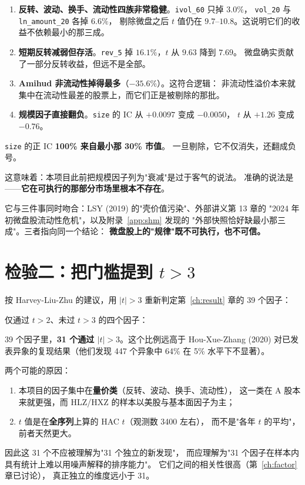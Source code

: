 \begin{enumerate}
  \item \textbf{反转、波动、换手、流动性四族非常稳健}。\texttt{ivol\_60} 只掉 $3.0\%$，
        \texttt{vol\_20} 与 \texttt{ln\_amount\_20} 各掉 $6.6\%$，
        剔除微盘之后 $t$ 值仍在 $9.7$--$10.8$。这说明它们的收益不依赖最小的那三成。
  \item \textbf{短期反转减弱但存活}。\texttt{rev\_5} 掉 $16.1\%$，$t$ 从 $9.63$ 降到 $7.69$。
        微盘确实贡献了一部分反转收益，但远不是全部。
  \item \textbf{Amihud 非流动性掉得最多}（$-35.6\%$）。这符合逻辑：
        非流动性溢价本来就集中在流动性最差的股票上，而它们正是被剔除的那批。
  \item \textbf{规模因子直接翻负}。\texttt{size} 的 IC 从 $+0.0097$ 变成 $-0.0050$，
        $t$ 从 $+1.26$ 变成 $-0.76$。
\end{enumerate}

\begin{keybox}[这一条最重要]
\texttt{size} 的正 IC \textbf{100\% 来自最小那 30\% 市值}。
一旦剔除，它不仅消失，还翻成负号。

这意味着：本项目此前把规模因子列为"衰减"是过于客气的说法。
准确的说法是——\textbf{它在可执行的那部分市场里根本不存在}。

它与三件事同时吻合：LSY (2019) 的"壳价值污染"、外部讲义第 13 章的
"2024 年初微盘股流动性危机"，以及附录~\ref{app:shm} 发现的
"外部快照恰好缺最小那三成"。三者指向同一个结论：
\textbf{微盘股上的"规律"既不可执行，也不可信。}
\end{keybox}

\section{检验二：把门槛提到 $t>3$}

按 Harvey-Liu-Zhu 的建议，用 $|t|>3$ 重新判定第~\ref{ch:result} 章的 39 个因子：



仅通过 $t>2$、未过 $t>3$ 的四个因子：



\begin{keybox}[结论]
39 个因子里，\textbf{31 个通过 $|t|>3$}。这个比例远高于 Hou-Xue-Zhang (2020)
对已发表异象的复现结果（他们发现 447 个异象中 64\% 在 5\% 水平下不显著）。

两个可能的原因：
\begin{enumerate}
  \item 本项目的因子集中在\textbf{量价类}（反转、波动、换手、流动性），
        这一类在 A 股本来就更强，而 HLZ/HXZ 的样本以美股与基本面因子为主；
  \item $t$ 值是在\textbf{全序列}上算的 HAC $t$（观测数 3400 左右），
        而不是"各年 $t$ 的平均"，前者天然更大。
\end{enumerate}

因此这 31 个不应被理解为"31 个独立的新发现"，
而应理解为"31 个因子在样本内具有统计上难以用噪声解释的排序能力"。
它们之间的相关性很高（第~\ref{ch:factor} 章已讨论），
真正独立的维度远小于 31。
\end{keybox}

